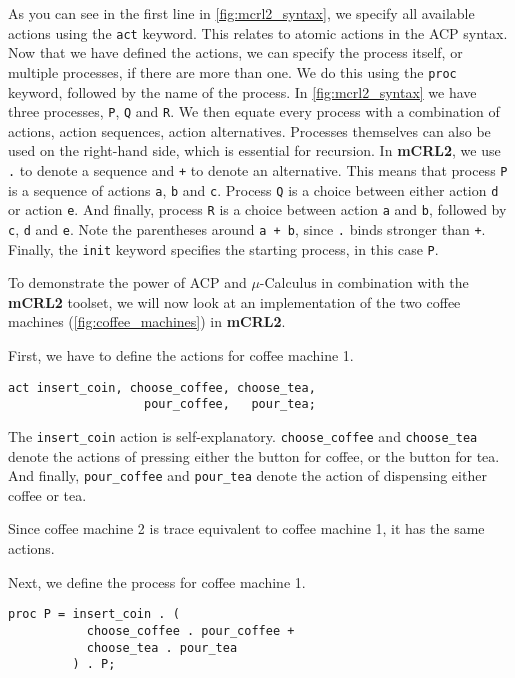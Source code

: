 \documentclass{clseminar}
\begin{document}
  As you can see in the first line in \autoref{fig:mcrl2_syntax}, we specify all available actions using the \texttt{act} keyword. This relates to atomic actions in the ACP syntax. Now that we have defined the actions, we can specify the process itself, or multiple processes, if there are more than one. We do this using the \texttt{proc} keyword, followed by the name of the process. In \autoref{fig:mcrl2_syntax} we have three processes, \texttt{P}, \texttt{Q} and \texttt{R}. We then equate every process with a combination of actions, action sequences, action alternatives. Processes themselves can also be used on the right-hand side, which is essential for recursion. In \textbf{mCRL2}, we use \texttt{.} to denote a sequence and \texttt{+} to denote an alternative. This means that process \texttt{P} is a sequence of actions \texttt{a}, \texttt{b} and \texttt{c}. Process \texttt{Q} is a choice between either action \texttt{d} or action \texttt{e}. And finally, process \texttt{R} is a choice between action \texttt{a} and \texttt{b}, followed by \texttt{c}, \texttt{d} and \texttt{e}. Note the parentheses around \texttt{a + b}, since \texttt{.} binds stronger than \texttt{+}. Finally, the \texttt{init} keyword specifies the starting process, in this case \texttt{P}.

  To demonstrate the power of ACP and $\mu$-Calculus in combination with the \textbf{mCRL2} toolset, we will now look at an implementation of the two coffee machines (\autoref{fig:coffee_machines}) in \textbf{mCRL2}.

  First, we have to define the actions for coffee machine 1.

  \begin{lstlisting}[language=mCRL2]
act insert_coin, choose_coffee, choose_tea,
                   pour_coffee,   pour_tea;
  \end{lstlisting}

  The \texttt{insert\_coin} action is self-explanatory. \texttt{choose\_coffee} and \texttt{choose\_tea} denote the actions of pressing either the button for coffee, or the button for tea. And finally, \texttt{pour\_coffee} and \texttt{pour\_tea} denote the action of dispensing either coffee or tea.

  Since coffee machine 2 is trace equivalent to coffee machine 1, it has the same actions.

  Next, we define the process for coffee machine 1.

  \begin{lstlisting}[language=mCRL2]
proc P = insert_coin . (
           choose_coffee . pour_coffee +
           choose_tea . pour_tea
         ) . P;
  \end{lstlisting}
\end{document}
